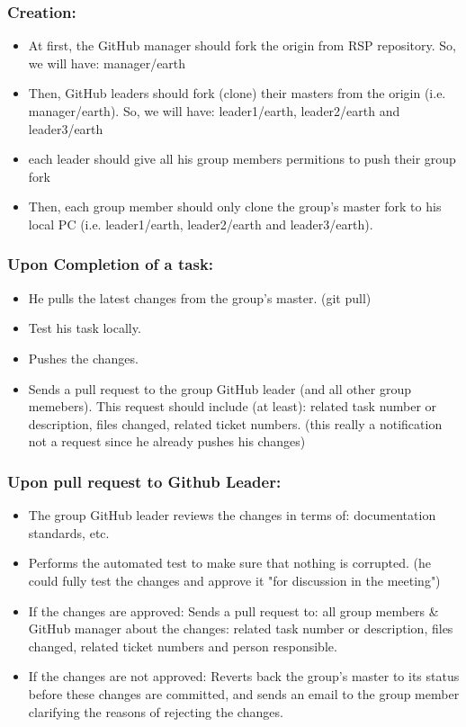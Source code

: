 \documentclass{article}
\begin{document}
\subsubsection{Creation:}
\begin{itemize}	
\item At first, the GitHub manager should fork the origin from RSP repository. So, we will have: manager/earth
\item Then, GitHub leaders should fork (clone) their masters from the origin (i.e. manager/earth). So, we will have: leader1/earth, leader2/earth and leader3/earth
\item each leader should give all his group members permitions to push their group fork
\item Then, each group member should only clone the group's master fork to his local PC (i.e. leader1/earth, leader2/earth and leader3/earth).
\end{itemize}

\subsubsection{Upon Completion of a task:}
\begin{itemize}	
\item He pulls the latest changes from the group's master. (git pull)
\item Test his task locally.
\item Pushes the changes.
\item Sends a pull request to the group GitHub leader (and all other group memebers). This request should include (at least): related task number or description, files changed, related ticket numbers. (this really a notification not a request since he already pushes his changes)
\end{itemize}

\subsubsection{Upon pull request to Github Leader:}
\begin{itemize}	
\item The group GitHub leader reviews the changes in terms of: documentation standards, etc.
\item Performs the automated test to make sure that nothing is corrupted. (he could fully test the changes and approve it "for discussion in the meeting")
\item If the changes are approved: Sends a pull request to: all group members & GitHub manager about the changes:  related task number or description, files changed, related ticket numbers and person responsible.
\item If the changes are not approved: Reverts back the group's master  to its status before these changes are committed, and sends an email to the group member clarifying the reasons of rejecting the changes.
\end{itemize}
\end{document}
